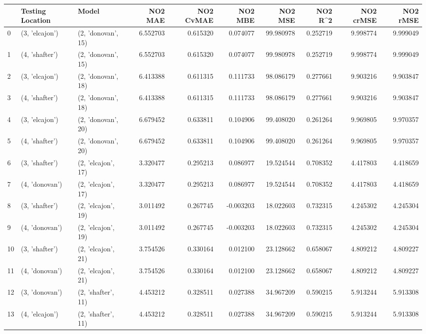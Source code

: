 \begin{tabular}{lllrrrrrrr}
\toprule
{} & Testing Location &               Model &   NO2 MAE &  NO2 CvMAE &   NO2 MBE &     NO2 MSE &   NO2 R\textasciicircum2 &  NO2 crMSE &   NO2 rMSE \\
\midrule
0  &   (3, 'elcajon') &  (2, 'donovan', 15) &  6.552703 &   0.615320 &  0.074077 &   99.980978 &  0.252719 &   9.998774 &   9.999049 \\
1  &   (4, 'shafter') &  (2, 'donovan', 15) &  6.552703 &   0.615320 &  0.074077 &   99.980978 &  0.252719 &   9.998774 &   9.999049 \\
2  &   (3, 'elcajon') &  (2, 'donovan', 18) &  6.413388 &   0.611315 &  0.111733 &   98.086179 &  0.277661 &   9.903216 &   9.903847 \\
3  &   (4, 'shafter') &  (2, 'donovan', 18) &  6.413388 &   0.611315 &  0.111733 &   98.086179 &  0.277661 &   9.903216 &   9.903847 \\
4  &   (3, 'elcajon') &  (2, 'donovan', 20) &  6.679452 &   0.633811 &  0.104906 &   99.408020 &  0.261264 &   9.969805 &   9.970357 \\
5  &   (4, 'shafter') &  (2, 'donovan', 20) &  6.679452 &   0.633811 &  0.104906 &   99.408020 &  0.261264 &   9.969805 &   9.970357 \\
6  &   (3, 'shafter') &  (2, 'elcajon', 17) &  3.320477 &   0.295213 &  0.086977 &   19.524544 &  0.708352 &   4.417803 &   4.418659 \\
7  &   (4, 'donovan') &  (2, 'elcajon', 17) &  3.320477 &   0.295213 &  0.086977 &   19.524544 &  0.708352 &   4.417803 &   4.418659 \\
8  &   (3, 'shafter') &  (2, 'elcajon', 19) &  3.011492 &   0.267745 & -0.003203 &   18.022603 &  0.732315 &   4.245302 &   4.245304 \\
9  &   (4, 'donovan') &  (2, 'elcajon', 19) &  3.011492 &   0.267745 & -0.003203 &   18.022603 &  0.732315 &   4.245302 &   4.245304 \\
10 &   (3, 'shafter') &  (2, 'elcajon', 21) &  3.754526 &   0.330164 &  0.012100 &   23.128662 &  0.658067 &   4.809212 &   4.809227 \\
11 &   (4, 'donovan') &  (2, 'elcajon', 21) &  3.754526 &   0.330164 &  0.012100 &   23.128662 &  0.658067 &   4.809212 &   4.809227 \\
12 &   (3, 'donovan') &  (2, 'shafter', 11) &  4.453212 &   0.328511 &  0.027388 &   34.967209 &  0.590215 &   5.913244 &   5.913308 \\
13 &   (4, 'elcajon') &  (2, 'shafter', 11) &  4.453212 &   0.328511 &  0.027388 &   34.967209 &  0.590215 &   5.913244 &   5.913308 \\

\end{tabular}
